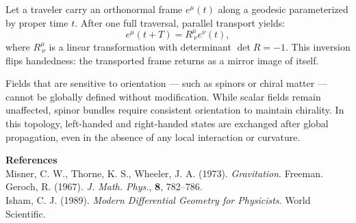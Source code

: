 \begin{technical}
Let a traveler carry an orthonormal frame \(e^\mu(t)\) along a geodesic parameterized by proper time \(t\). After one full traversal, parallel transport yields:
\[
e^\mu(t + T) = R^\mu_{\ \nu} e^\nu(t),
\]
where \(R^\mu_{\ \nu}\) is a linear transformation with determinant \(\det R = -1\). This inversion flips handedness: the transported frame returns as a mirror image of itself.

Fields that are sensitive to orientation — such as spinors or chiral matter — cannot be globally defined without modification. While scalar fields remain unaffected, spinor bundles require consistent orientation to maintain chirality. In this topology, left-handed and right-handed states are exchanged after global propagation, even in the absence of any local interaction or curvature.

\vspace{0.5em}
\noindent\textbf{References}\\
Misner, C. W., Thorne, K. S., Wheeler, J. A. (1973). \textit{Gravitation}. Freeman.\\
Geroch, R. (1967). \textit{J. Math. Phys.}, \textbf{8}, 782--786.\\
Isham, C. J. (1989). \textit{Modern Differential Geometry for Physicists}. World Scientific.
\end{technical}
